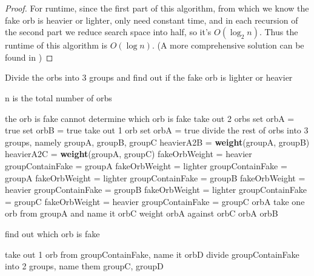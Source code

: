 \documentclass[paper=a4, fontsize=11pt]{scrartcl} %
\numberwithin{equation}{section} %
\numberwithin{figure}{section} %
\numberwithin{table}{section} %
\newenvironment{myproof}{\begin{proof}\setlength{\parindent}{2em}}{\end{proof}}
\begin{document}
\begin{enumerate}
\begin{myproof}
For runtime, since the first part of this algorithm, from which we know the fake orb is heavier or lighter, only need constant time, and in each recursion of the second part we reduce search space into half, so it's $O(\log_2 n)$. Thus the runtime of this algorithm is $O(\log n)$.
(A more comprehensive solution can be found in \cite{MD03})\qedhere
\end{myproof}
\begin{algorithm}
\caption{Divide the orbs into 3 groups and find out if the fake orb is lighter or heavier}
n is the total number of orbs
\begin{algorithmic}
	\RETURN the orb is fake
	\RETURN cannot determine which orb is fake
     	\STATE take out 2 orbs
     	\STATE set orbA = true
     	\STATE set orbB = true
		\STATE take out 1 orb
		\STATE set orbA = true
	\ENDIF
	\STATE divide the rest of orbs into 3 groups, namely groupA, groupB, groupC
	\STATE heavierA2B = \textbf{weight}(groupA, groupB)
	\STATE heavierA2C = \textbf{weight}(groupA, groupC)
		\STATE fakeOrbWeight = heavier
		\STATE groupContainFake = groupA
		\STATE fakeOrbWeight = lighter
		\STATE groupContainFake =  groupA
		\STATE fakeOrbWeight = lighter
		\STATE groupContainFake = groupB
		\STATE fakeOrbWeight = heavier
		\STATE groupContainFake = groupB
		\STATE fakeOrbWeight = lighter
		\STATE groupContainFake = groupC
		\STATE fakeOrbWeight = heavier
		\STATE groupContainFake = groupC
	\ELSE
			\RETURN orbA
		\ELSE
			\STATE take one orb from groupA and name it orbC
			\STATE weight orbA against orbC
				\RETURN orbA
			\ELSE 
				\RETURN orbB
			\ENDIF
		\ENDIF
	\ENDIF
\ENDIF
\end{algorithmic}
\end{algorithm}
\begin{algorithm}
\caption{find out which orb is fake}
\begin{algorithmic}
		\STATE take out 1 orb from groupContainFake, name it orbD
	\ENDIF
	\STATE divide groupContainFake into 2 groups, name them groupC, groupD

\end{algorithmic}
\end{algorithm}
\end{enumerate}
\end{document}
